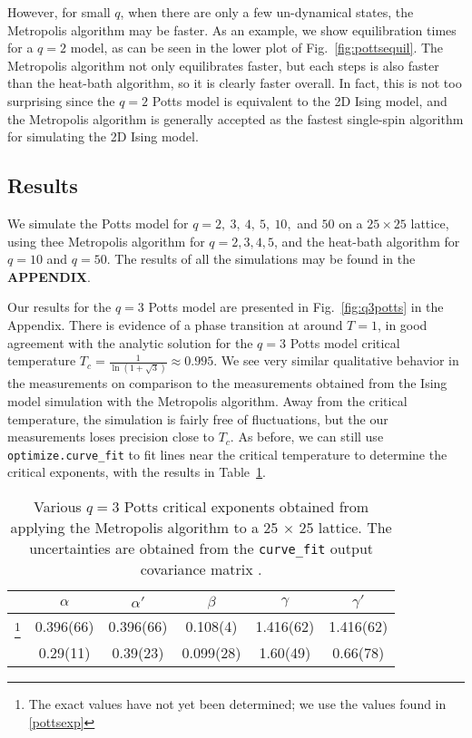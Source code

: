 \documentclass[twocolumn,aps]{revtex4-1} %
\begin{document}
However, for small $q$, when there are only a few un-dynamical states, the Metropolis algorithm may be faster. As an example, we show equilibration times for a $q = 2$ model, as can be seen in the lower plot of Fig.~\ref{fig:pottsequil}. The Metropolis algorithm not only equilibrates faster, but each steps is also faster than the heat-bath algorithm, so it is clearly faster overall. In fact, this is not too surprising since the $q = 2$ Potts model is equivalent to the 2D Ising model, and the Metropolis algorithm is generally accepted as the fastest single-spin algorithm for simulating the 2D Ising model. 

\subsection{Results}
We simulate the Potts model for $q = 2,\ 3,\ 4,\ 5,\ 10,$ and $50$ on a $25 \times 25$ lattice, using thee Metropolis algorithm for $q = 2, 3, 4, 5$, and the heat-bath algorithm for $q = 10$ and $q = 50$. The results of all the simulations may be found in the \textbf{APPENDIX}.

Our results for the $q = 3$ Potts model are presented in Fig.~\ref{fig:q3potts} in the Appendix. There is evidence of a phase transition at around $T = 1$, in good agreement with the analytic solution for the $q = 3$ Potts model critical temperature $T_c = \frac{1}{\ln(1+\sqrt{3})} \approx 0.995$. We see very similar qualitative behavior in the measurements on comparison to the measurements obtained from the Ising model simulation with the Metropolis algorithm. Away from the critical temperature, the simulation is fairly free of fluctuations, but the our measurements loses precision close to $T_c$. As before, we can still use \texttt{optimize.curve\_fit} to fit lines near the critical temperature to determine the critical exponents, with the results in Table~\ref{tab:potts}.
\begin{table}
	\caption{\label{tab:potts}Various $q = 3$ Potts critical exponents obtained from applying the Metropolis algorithm to a 25 $\times$ 25 lattice. The uncertainties are obtained from the \texttt{curve\_fit} output covariance matrix .}
	\begin{ruledtabular}
		\begin{tabular}{cccccc}
			& $\alpha$ & $\alpha'$ & $\beta$ & $\gamma$ & $\gamma'$ \\
			\hline 
			\text{Analytic}\footnote{The exact values have not yet been determined; we use the values found in \ref{pottsexp}} & 0.396(66) & 0.396(66) & 0.108(4) & 1.416(62) & 1.416(62) \\
			\text{MC 25} &  0.29(11) & 0.39(23) & 0.099(28) & 1.60(49) & 0.66(78)
		\end{tabular}
	\end{ruledtabular}
\end{table}
\end{document}
